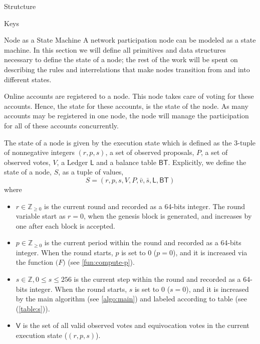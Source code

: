 \documentclass[10pt,a4paper]{article}
\begin{document}
\begin{section}{Strutcture}
\begin{subsection}{Keys}
\end{subsection}
\begin{subsection}{Node as a State Machine}
A network participation node can be modeled as a state machine.
In this section we will define all primitives and data structures necessary to define the state
of a node; the rest of the work will be spent on describing the rules and interrelations that
make nodes transition from and into different states.

Online accounts are registered to a node. This node takes care of voting for these accounts.
Hence, the state for these accounts, is the state of the node. As many accounts may be 
registered in one node, the node will manage the participation for all of these accounts 
concurrently.

The {\sf state of a node} 
is given by the {\sf execution state} which is defined as the 3-tuple of nonnegative integers $(r, p, s)$, 
a set of observed proposals, $P$, 
a set of observed votes, $V$, 
a Ledger $\mathsf{L}$ and 
a balance table $\mathsf{BT}$.
Explicitly, we define the state of a node, $S$, as a tuple of values, 
$$
S = (r, p, s, V, P, \bar{v}, \bar{s}, \mathsf{L}, \mathsf{BT})
$$ 
where
\begin{itemize}
    \item 
    $r\in\mathbb{Z}_{\ge 0}$ is the current {\sf round} and recorded as a 64-bits integer. 
    The round variable start as $r=0$, when the genesis block is generated, and increases
    by one after each block is accepted.
    
    \item 
    $p\in\mathbb{Z}_{\ge 0}$ is the current {\sf period} within the round and recorded as 
    a 64-bits integer. When the round starts, $p$ is set to 0 ($p=0$), and it is 
    increased via the function $\mathcal(F)$ (see \ref{fun:compute-p}).
    
    \item 
    $s\in\mathbb{Z}, 0\le s\le 256$ is the current {\sf step} within the round 
    and recorded as a 64-bits integer. When the round starts, $s$ is set to 0 ($s=0$), 
    and it is increased by the main algorithm (see \ref{algo:main}) and 
    labeled according to table (see (\ref{table:s})).
    
    \item
    $\mathsf{V}$ is the set of all valid {\sf observed votes} and 
    {\sf equivocation votes} in the current execution state
    ($(r,p,s)$).
    

\end{itemize}
\end{subsection}
\end{section}
\end{document}
